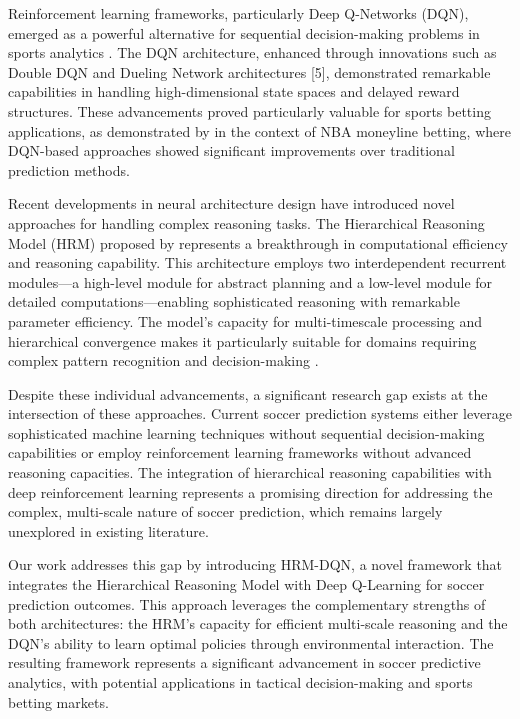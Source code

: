 \documentclass[3p,times,procedia]{elsarticle}
\begin{document}
Reinforcement learning frameworks, particularly Deep Q-Networks (DQN), emerged as a powerful alternative for sequential decision-making problems in sports analytics \cite{mnih2015human}. The DQN architecture, enhanced through innovations such as Double DQN \cite{van2016deep} and Dueling Network architectures [5], demonstrated remarkable capabilities in handling high-dimensional state spaces and delayed reward structures. These advancements proved particularly valuable for sports betting applications, as demonstrated by \cite{shaviroreinforcement} in the context of NBA moneyline betting, where DQN-based approaches showed significant improvements over traditional prediction methods.

Recent developments in neural architecture design have introduced novel approaches for handling complex reasoning tasks. The Hierarchical Reasoning Model (HRM) proposed by \cite{wang2025hierarchical} represents a breakthrough in computational efficiency and reasoning capability. This architecture employs two interdependent recurrent modules—a high-level module for abstract planning and a low-level module for detailed computations—enabling sophisticated reasoning with remarkable parameter efficiency. The model's capacity for multi-timescale processing and hierarchical convergence makes it particularly suitable for domains requiring complex pattern recognition and decision-making \cite{wang2025hierarchical}.

Despite these individual advancements, a significant research gap exists at the intersection of these approaches. Current soccer prediction systems either leverage sophisticated machine learning techniques without sequential decision-making capabilities or employ reinforcement learning frameworks without advanced reasoning capacities. The integration of hierarchical reasoning capabilities with deep reinforcement learning represents a promising direction for addressing the complex, multi-scale nature of soccer prediction, which remains largely unexplored in existing literature.

Our work addresses this gap by introducing HRM-DQN, a novel framework that integrates the Hierarchical Reasoning Model with Deep Q-Learning for soccer prediction outcomes. This approach leverages the complementary strengths of both architectures: the HRM's capacity for efficient multi-scale reasoning and the DQN's ability to learn optimal policies through environmental interaction. The resulting framework represents a significant advancement in soccer predictive analytics, with potential applications in tactical decision-making and sports betting markets.
\end{document}
